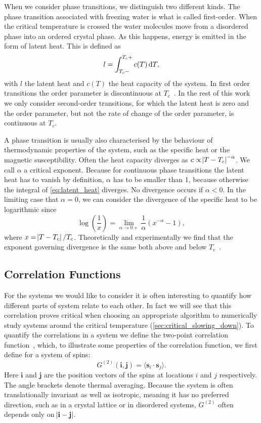 \documentclass[11pt, a4paper]{report} %
\begin{document}
When we consider phase transitions, we distinguish two different kinds.
The phase transition associated with freezing water is what is called first-order.
When the critical temperature is crossed the water molecules move from a disordered phase into an ordered crystal phase.
As this happens, energy is emitted in the form of latent heat.
This is defined as
\begin{equation}
	\label{eq:latent_heat}
	l = \int_{T_c-}^{T_c+} c(T) \dif T,
\end{equation}
with \(l\) the latent heat and \(c(T)\) the heat capacity of the system.
In first order transitions the order parameter is discontinuous at \(T_c\)~\cite{binney:1992}.
In the rest of this work we only consider second-order transitions, for which the latent heat is zero and the order parameter, but not the rate of change of the order parameter, is continuous at \(T_c\).

A phase transition is usually also characterised by the behaviour of thermodynamic properties of the system, such as the specific heat or the magnetic susceptibility.
Often the heat capacity diverges as \(c \propto \abs{T-T_c}^{-\alpha}\).
We call \(\alpha\) a critical exponent.
Because for continuous phase transitions the latent heat has to vanish by definition, \(\alpha\) has to be smaller than 1, because otherwise the integral of \cref{eq:latent_heat} diverges.
No divergence occurs if \(\alpha < 0\).
In the limiting case that \(\alpha = 0\), we can consider the divergence of the specific heat to be logarithmic since
\begin{equation}
	\log(\frac{1}{x}) = \lim_{\alpha \to 0+} \frac{1}{\alpha}\left(x^{-\alpha} - 1\right),
\end{equation}
where \(x = \abs{T - T_c}/T_c\).
Theoretically and experimentally we find that the exponent governing divergence is the same both above and below \(T_c\)~\cite{binney:1992}.

\subsection{Correlation Functions}
For the systems we would like to consider it is often interesting to quantify how different parts of system relate to each other.
In fact we will see that this correlation proves critical when choosing an appropriate algorithm to numerically study systems around the critical temperature (\cref{sec:critical_slowing_down}).
To quantify the correlations in a system we define the two-point correlation function~\cite{binney:1992}, which, to illustrate some properties of the correlation function, we first define for a system of spins:
\begin{equation}
	G^{(2)}(\mathbf{i}, \mathbf{j}) = \langle{\mathbf{s}_i \cdot \mathbf{s}_j}\rangle.
\end{equation}
Here \(\mathbf{i}\) and \(\mathbf{j}\) are the position vectors of the spins at locations \(i\) and \(j\) respectively.
The angle brackets denote thermal averaging.
Because the system is often translationally invariant as well as isotropic, meaning it has no preferred direction, such as in a crystal lattice or in disordered systems, \(G^{(2)}\) often depends only on \(\abs{\mathbf{i} - \mathbf{j}} \).
\end{document}

